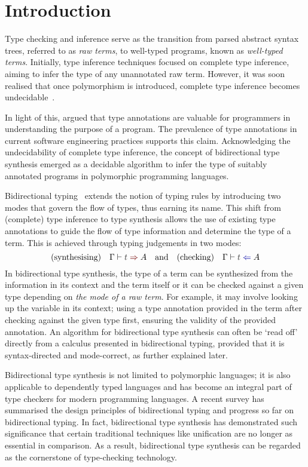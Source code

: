 
\section{Introduction}\label{sec:intro}

Type checking and inference serve as the transition from parsed abstract syntax trees, referred to as \emph{raw terms}, to well-typed programs, known as \emph{well-typed terms}.
Initially, type inference techniques focused on complete type inference, aiming to infer the type of any unannotated raw term.
However, it was soon realised that once polymorphism is introduced, complete type inference becomes undecidable~\citep{Wells1999}.

In light of this, \citet{Pierce2000} argued that type annotations are valuable for programmers in understanding the purpose of a program.
The prevalence of type annotations in current software engineering practices supports this claim.
Acknowledging the undecidability of complete type inference, the concept of bidirectional type synthesis emerged as a decidable algorithm to infer the type of suitably annotated programs in polymorphic programming languages.

Bidirectional typing~\citep{Pierce2000} extends the notion of typing rules by introducing two modes that govern the flow of types, thus earning its name.
This shift from (complete) type inference to type synthesis allows the use of existing type annotations to guide the flow of type information and determine the type of a term.
This is achieved through typing judgements in two modes:
  \[
    (\text{synthesising})\quad \Gamma \vdash \isTerm{t} \syn A
    \quad\text{and}\quad
    (\text{checking})\quad \Gamma \vdash \isTerm{t} \chk A
  \]
  In bidirectional type synthesis, the type of a term can be synthesized from the information in its context and the term itself or it can be checked against a given type depending on \emph{the mode of a raw term}.
For example, it may involve looking up the variable in its context; using a type annotation provided in the term after checking against the given type first, ensuring the validity of the provided annotation.
An algorithm for bidirectional type synthesis can often be `read off' directly from a calculus presented in bidirectional typing, provided that it is syntax-directed and mode-correct, as further explained later.

Bidirectional type synthesis is not limited to polymorphic languages; it is also applicable to dependently typed languages and has become an integral part of type checkers for modern programming languages.
A recent survey has summarised the design principles of bidirectional typing and progress so far on bidirectional typing.
 In fact, bidirectional type synthesis has demonstrated such significance that certain traditional techniques like unification are no longer as essential in comparison.
 As a result, bidirectional type synthesis can be regarded as the cornerstone of type-checking technology.

